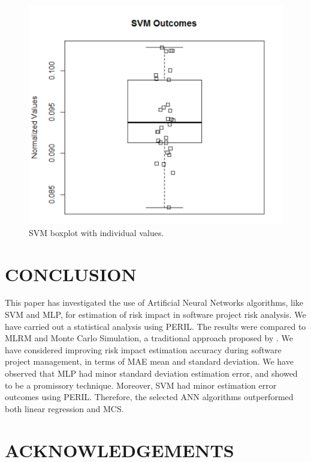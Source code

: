 \documentclass[a4paper,twoside]{article}
\begin{document}
\begin{figure}[!h]
  \vspace{-0.2cm}
  \centering
  \includegraphics[width=\columnwidth]{images/svm_exclusive.pdf}
  \caption{SVM boxplot with individual values.}
  \label{fig:svm_exclusive}
\end{figure}

\section{\uppercase{Conclusion}}
\label{sec:conclusion}

\noindent This paper has investigated the use of Artificial Neural Networks algorithms, like SVM and MLP, for estimation of risk impact in software project risk analysis. We have carried out a statistical analysis using PERIL. The results were compared to MLRM and Monte Carlo Simulation, a traditional approach proposed by \cite{PMBOK2008}. We have considered improving risk impact estimation accuracy during software project management, in terms of MAE mean and standard deviation. We have observed that MLP had minor standard deviation estimation error, and showed to be a promissory technique. Moreover, SVM had minor estimation error outcomes using PERIL. Therefore, the selected ANN algorithms outperformed both linear regression and MCS.

\section*{\uppercase{Acknowledgements}}
\end{document}
